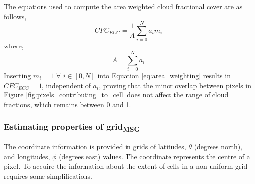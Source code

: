 The equations used to compute the area weighted cloud fractional cover are as follows,
\begin{equation} \label{eq:area_weighting}
    CFC_{ECC} = \frac{1}{A} \sum_{i=0}^{N} a_i m_i
\end{equation}
where,
\begin{equation} \label{eq:tot_area}
    A = \sum_{i=0}^{N} a_i
\end{equation}
Inserting $m_i = 1$ $\forall$ $i \in [0,N]$ into Equation \eqref{eq:area_weighting} results in $CFC_{ECC}=1$, independent of $a_i$, proving that the minor overlap between pixels in Figure \ref{fig:pixels_contributing_to_cell} does not affect the range of cloud fractions, which remains between 0 and 1.

\subsubsection{Estimating properties of grid\textsubscript{MSG}}
The coordinate information is provided in grids of latitudes, $\theta$ (degrees north), and longitudes, $\phi$ (degrees east) values. The coordinate represents the centre of a pixel. To acquire the information about the extent of cells in a non-uniform grid requires some simplifications. 

